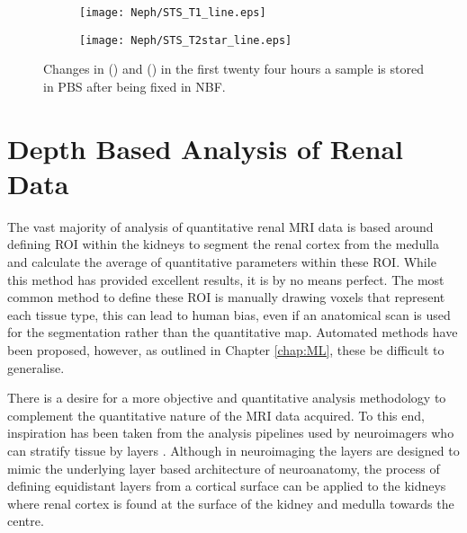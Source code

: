 \begin{figure}[H]
	\centering
	\begin{subfigure}[c]{0.47\textwidth}
		\centering
		\texttt{[image: Neph/STS\_T1\_line.eps]}
		\caption{}
		\label{fig:ex_fixation_t1_3t_sts}
	\end{subfigure}
	\hfill
	\begin{subfigure}[c]{0.47\textwidth}
		\centering
		\texttt{[image: Neph/STS\_T2star\_line.eps]}
		\caption{}
		\label{fig:ex_fixation_t2star_3t_sts}
	\end{subfigure}
	\caption{Changes in \tone () and \ttwostar () in the first twenty four hours a sample is stored in \ac{PBS} after being fixed in \ac{NBF}.}
	\label{fig:ex_fixation_sts}
\end{figure}

\section{Depth Based Analysis of Renal Data}
\label{sec:ex_layers}
The vast majority of analysis of quantitative renal \ac{MRI} data is based around defining \ac{ROI} within the kidneys to segment the renal cortex from the medulla and calculate the average of quantitative parameters within these \ac{ROI}. While this method has provided excellent results, it is by no means perfect. The most common method to define these \ac{ROI} is manually drawing voxels that represent each tissue type, this can lead to human bias, even if an anatomical scan is used for the segmentation rather than the quantitative map. Automated methods have been proposed, however, as outlined in Chapter \ref{chap:ML}, these be difficult to generalise.

There is a desire for a more objective and quantitative analysis methodology to complement the quantitative nature of the \ac{MRI} data acquired. To this end, inspiration has been taken from the analysis pipelines used by neuroimagers who can stratify tissue by layers \cite{self_benchmarking_2019, muckli_contextual_2015, waehnert_anatomically_2014, taso_regional_2021}. Although in neuroimaging the layers are designed to mimic the underlying layer based architecture of neuroanatomy, the process of defining equidistant layers from a cortical surface can be applied to the kidneys where renal cortex is found at the surface of the kidney and medulla towards the centre. 

